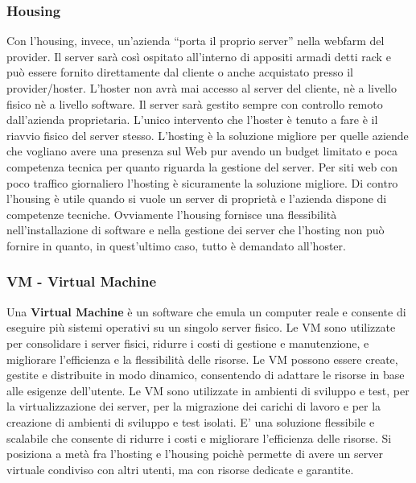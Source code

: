 \documentclass[12pt]{report}
\begin{document}
	\subsubsection{Housing}
	Con l’housing, invece, un’azienda “porta il proprio server” nella webfarm del provider. Il server sarà così ospitato all’interno di appositi armadi detti rack e può essere fornito direttamente dal cliente o anche acquistato presso il provider/hoster. L’hoster non avrà mai accesso al server del cliente, nè a livello fisico nè a livello software. Il server sarà gestito sempre con controllo remoto dall’azienda proprietaria. L’unico intervento che l’hoster è tenuto a fare è il riavvio fisico del server stesso. L’hosting è la soluzione migliore per quelle aziende che vogliano avere una presenza sul Web pur avendo un budget limitato e poca competenza tecnica per quanto riguarda la gestione del server. Per siti web con poco traffico giornaliero l’hosting è sicuramente la soluzione migliore. Di contro l’housing è utile quando si vuole un server di proprietà e l’azienda dispone di competenze tecniche. Ovviamente l’housing fornisce una flessibilità nell’installazione di software e nella gestione dei server che l’hosting non può fornire in quanto, in quest’ultimo caso, tutto è demandato all’hoster.

	\subsubsection{VM - Virtual Machine}
	Una \textbf{Virtual Machine} è un software che emula un computer reale e consente di eseguire più sistemi operativi su un singolo server fisico. Le VM sono utilizzate per consolidare i server fisici, ridurre i costi di gestione e manutenzione, e migliorare l'efficienza e la flessibilità delle risorse. Le VM possono essere create, gestite e distribuite in modo dinamico, consentendo di adattare le risorse in base alle esigenze dell'utente. Le VM sono utilizzate in ambienti di sviluppo e test, per la virtualizzazione dei server, per la migrazione dei carichi di lavoro e per la creazione di ambienti di sviluppo e test isolati. E' una soluzione flessibile e scalabile che consente di ridurre i costi e migliorare l'efficienza delle risorse. Si posiziona a metà fra l'hosting e l'housing poichè permette di avere un server virtuale condiviso con altri utenti, ma con risorse dedicate e garantite.
\end{document}
